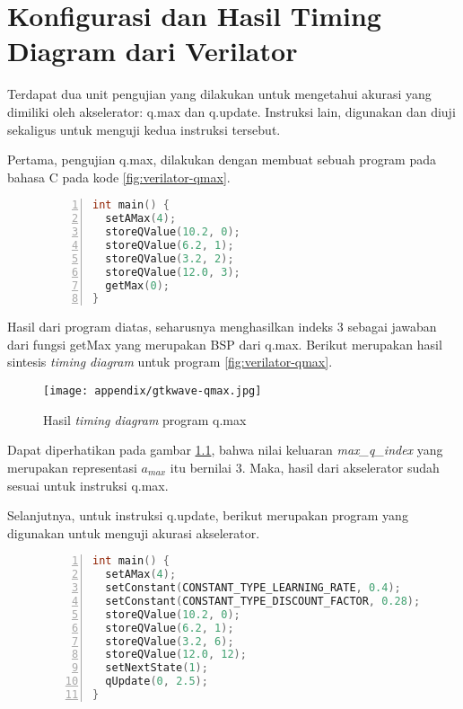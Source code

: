 \chapter{Konfigurasi dan Hasil Timing Diagram dari Verilator}
\label{appendix:verilator}

Terdapat dua unit pengujian yang dilakukan untuk mengetahui akurasi yang dimiliki oleh akselerator: q.max dan q.update. Instruksi lain, digunakan dan diuji sekaligus untuk menguji kedua instruksi tersebut.

Pertama, pengujian q.max, dilakukan dengan membuat sebuah program pada bahasa C pada kode \ref{fig:verilator-qmax}.

\begin{figure}[H]
	\centering
	\begin{lstlisting}[language=C,escapechar=|,numbers=left,caption={Program bahasa C untuk pengujian q.max},label={fig:verilator-qmax},captionpos=b]
int main() {
  setAMax(4);
  storeQValue(10.2, 0);
  storeQValue(6.2, 1);
  storeQValue(3.2, 2);
  storeQValue(12.0, 3);
  getMax(0);
}
\end{lstlisting}
\end{figure}

Hasil dari program diatas, seharusnya menghasilkan indeks 3 sebagai jawaban dari fungsi getMax yang merupakan \ac{BSP} dari q.max. Berikut merupakan hasil sintesis \textit{timing diagram} untuk program \ref{fig:verilator-qmax}.

\begin{figure}[h]
	\centering
	\texttt{[image: appendix/gtkwave-qmax.jpg]}
	\caption{Hasil \textit{timing diagram} program q.max}
	\label{fig:gtkwave-qmax}
\end{figure}

Dapat diperhatikan pada gambar \ref{fig:gtkwave-qmax}, bahwa nilai keluaran \textit{max\_q\_index} yang merupakan representasi $a_{max}$ itu bernilai 3. Maka, hasil dari akselerator sudah sesuai untuk instruksi q.max.

Selanjutnya, untuk instruksi q.update, berikut merupakan program yang digunakan untuk menguji akurasi akselerator.


\begin{figure}[H]
	\centering
	\begin{lstlisting}[language=C,escapechar=|,numbers=left,caption={Program bahasa C untuk pengujian q.update},label={fig:verilator-qupdate},captionpos=b]
int main() {
  setAMax(4);
  setConstant(CONSTANT_TYPE_LEARNING_RATE, 0.4);
  setConstant(CONSTANT_TYPE_DISCOUNT_FACTOR, 0.28);
  storeQValue(10.2, 0);
  storeQValue(6.2, 1);
  storeQValue(3.2, 6);
  storeQValue(12.0, 12);
  setNextState(1);
  qUpdate(0, 2.5);
}
\end{lstlisting}
\end{figure}

